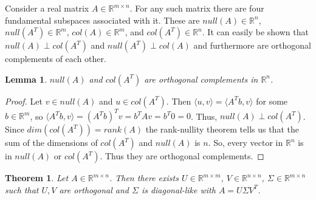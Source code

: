 \documentclass[11pt]{article}
\def\R{{\mathbb{R}}}
\newtheorem{lemma}{Lemma}
\newtheorem{theorem}{Theorem}
\begin{document}

Consider a real matrix $A \in \R^{m \times n}$. For any such matrix there are four fundamental subspaces associated with it. These are $\mathit{null}(A) \in \R^n$, $\mathit{null}(A^T) \in \R^m$, $\mathit{col}(A) \in \R^m$, and $\mathit{col}(A^T) \in \R^n$. It can easily be shown that $\mathit{null}(A) \perp \mathit{col}(A^T)$ and $\mathit{null}(A^T) \perp \mathit{col}(A)$ and furthermore are orthogonal complements of each other.

\begin{lemma}
$\mathit{null}(A)$ and $\mathit{col}(A^T)$ are orthogonal complements in $\R^n$.
\end{lemma}
\begin{proof}
Let $v \in \mathit{null}(A)$ and $u \in \mathit{col}(A^T)$. Then $\langle u, v \rangle = \langle A^Tb, v \rangle$ for some $b \in \R^m$, so $\langle A^Tb, v \rangle = (A^Tb)^Tv = b^T Av = b^T0 = 0$. Thus, $\mathit{null}(A) \perp \mathit{col}(A^T)$. Since $\mathit{dim} (\mathit{col}(A^T)) = \mathit{rank}(A)$ the rank-nullity theorem tells us that the sum of the dimensions of $\mathit{col}(A^T)$ and $\mathit{null}(A)$ is $n$. So, every vector in $\R^n$ is in $\mathit{null}(A)$ or $\mathit{col}(A^T)$. Thus they are orthogonal complements.
\end{proof}

\begin{theorem}

Let $A \in \R^{m \times n}$. Then there exists $U \in \R^{m \times m}$, $V \in \R^{n \times n}$, $\Sigma \in \R^{m \times n}$ such that $U, V$ are orthogonal and $\Sigma$ is diagonal-like with $A = U \Sigma V^{T}$.

\end{theorem}
\end{document}
